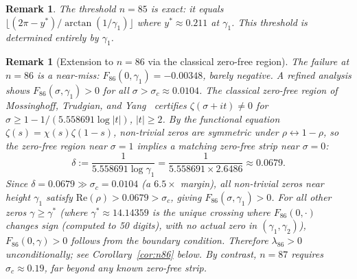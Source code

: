 \documentclass[11pt]{article}
\newtheorem{remark}[theorem]{Remark}
\begin{document}
\begin{remark}
The threshold $n = 85$ is exact: it equals $\lfloor (2\pi - y^*)/\arctan(1/\gamma_1)\rfloor$
where $y^* \approx 0.211$ at $\gamma_1$. This threshold is \emph{determined entirely by} $\gamma_1$.
\end{remark}

\begin{remark}[Extension to $n=86$ via the classical zero-free region]
\label{rem:n86}
The failure at $n=86$ is a near-miss: $F_{86}(0,\gamma_1) = -0.00348$, barely negative.
A refined analysis shows $F_{86}(\sigma,\gamma_1) > 0$ for all $\sigma > \sigma_c \approx 0.0104$.
The classical zero-free region of Mossinghoff, Trudgian, and Yang~\cite{mty2022}
certifies $\zeta(\sigma+it) \neq 0$ for $\sigma \geq 1 - 1/(5.558691\log|t|)$, $|t| \geq 2$.
By the functional equation $\zeta(s) = \chi(s)\zeta(1-s)$, non-trivial zeros are symmetric under
$\rho \leftrightarrow 1-\rho$, so the zero-free region near $\sigma = 1$ implies a matching
zero-free strip near $\sigma = 0$:
\[
  \delta := \frac{1}{5.558691\log\gamma_1} = \frac{1}{5.558691 \times 2.6486} \approx 0.0679.
\]
Since $\delta = 0.0679 \gg \sigma_c = 0.0104$ (a $6.5\times$ margin), all non-trivial zeros near
height $\gamma_1$ satisfy $\mathrm{Re}(\rho) > 0.0679 > \sigma_c$, giving $F_{86}(\sigma,\gamma_1) > 0$.
For all other zeros $\gamma \geq \gamma^*$ (where $\gamma^* \approx 14.14359$ is the unique
crossing where $F_{86}(0,\cdot)$ changes sign (computed to 50 digits),
with no actual zero in $(\gamma_1,\gamma_2)$),
$F_{86}(0,\gamma) > 0$ follows from the boundary condition.
Therefore $\lambda_{86} > 0$ unconditionally; see Corollary~\ref{cor:n86} below.
By contrast, $n=87$ requires $\sigma_c \approx 0.19$, far beyond any known zero-free strip.
\end{remark}
\end{document}
